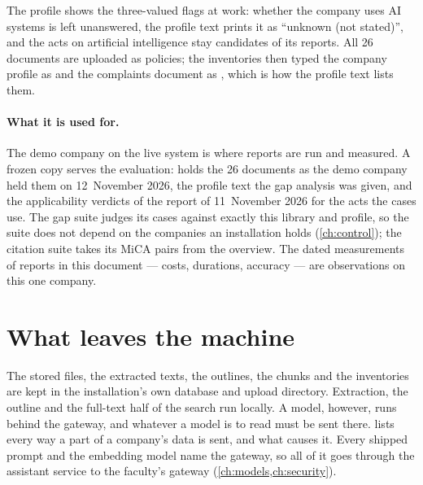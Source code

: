 The profile shows the three-valued flags at work: whether the company uses AI systems is left
unanswered, the profile text prints it as \enquote{unknown (not stated)}, and the acts on
artificial intelligence stay candidates of its reports. All 26 documents are uploaded as
policies; the inventories then typed the company profile as  and the complaints
document as , which is how the profile text lists them.

\paragraph{What it is used for.} The demo company on the live system is where reports are
run and measured. A frozen copy serves the evaluation: 
holds the 26 documents as the demo company held them on 12~November 2026, the profile text
the gap analysis was given, and the applicability verdicts of the report of 11~November 2026
for the acts the cases use. The gap suite judges its cases against exactly this library and
profile, so the suite does not depend on the companies an installation holds
(\cref{ch:control}); the citation suite takes its MiCA pairs from the overview. The dated
measurements of reports in this document --- costs, durations, accuracy --- are observations
on this one company.


\section{What leaves the machine}\label{sec:company:leaves}

The stored files, the extracted texts, the outlines, the chunks and the inventories are kept
in the installation's own database and upload directory. Extraction, the outline and the
full-text half of the search run locally. A model, however, runs behind the gateway, and
whatever a model is to read must be sent there.  lists every way a
part of a company's data is sent, and what causes it. Every shipped prompt and the embedding
model name the gateway, so all of it goes through the assistant service to the faculty's
gateway (\cref{ch:models,ch:security}).

